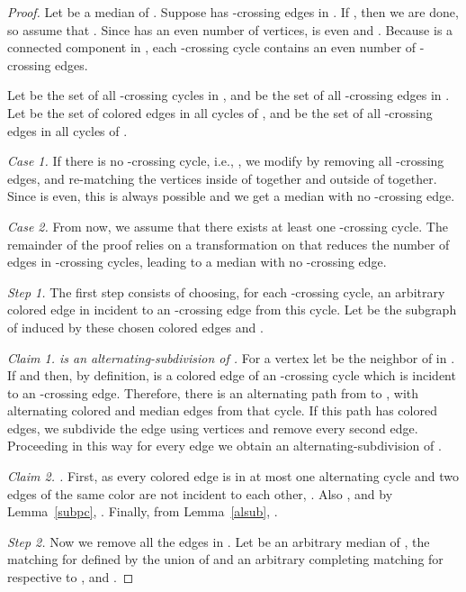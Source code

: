 \documentclass[10pt]{llncs}
\begin{document}
\begin{proof}
  Let  be a median of . Suppose  has  -crossing
  edges in . If , then we are done, so assume that
  . Since  has an even number of vertices,  is even
  and . Because  is a connected component in , each
  -crossing cycle contains an even number of -crossing edges.
  
  Let  be the set of all -crossing cycles in , and
   be the set of all -crossing edges in .  Let
   be the set of colored edges in all cycles of
  , and  be the set of all -crossing edges in
  all cycles of .

  {\smallskip\noindent\em Case 1.} If there is no -crossing cycle,
  i.e., , we modify  by
  removing all -crossing edges, and re-matching the vertices inside
  of  together and outside of  together. Since  is even,
  this is always possible and we get a median with no -crossing
  edge.  

  {\smallskip\noindent\em Case 2.} From now, we assume that there
  exists at least one -crossing cycle. The remainder of the proof
  relies on a transformation on  that reduces the number of edges
  in -crossing cycles, leading to a median with no -crossing
  edge.

  {\smallskip\noindent\em Step 1.} The first step consists of
  choosing, for each -crossing cycle, an arbitrary colored edge in
   incident to an -crossing edge from this cycle. Let  be the
  subgraph of  induced by these chosen colored edges and
  .



  {\smallskip\noindent\em Claim 1.  is an alternating-subdivision
    of .} For a vertex  let  be the neighbor of
   in . If  and  then, by
  definition,  is a colored edge of an -crossing cycle which is
  incident to an -crossing edge. Therefore, there is an alternating
  path from  to , with alternating colored and median edges
  from that cycle. If this path has  colored edges, we subdivide
  the edge  using  vertices and remove every second
  edge. Proceeding in this way for every edge  we obtain
  an alternating-subdivision  of .

  {\smallskip\noindent\em Claim 2. .} First, as every colored edge is in at most one
  alternating cycle and two edges of the same color are not incident
  to each other, . Also , and
  by Lemma~\ref{subpc}, . Finally, from
  Lemma~\ref{alsub}, .

  {\smallskip\noindent\em Step 2.} Now we remove all the edges in
  . Let  be an arbitrary median of ,  the
  matching for  defined by the union of  and an arbitrary
  completing matching for  respective to , and .


\end{proof}
\end{document}
